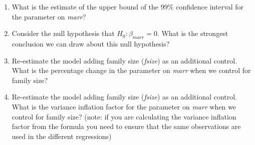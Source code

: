\begin{enumerate}
\item What is the estimate of the upper bound of the 99\% confidence interval for the parameter on \textit{marr}?

\item Consider the null hypothesis that $H_0:\beta_{marr}=0$. What is the strongest conclusion we can draw about this null hypothesis?

\item Re-estimate the model adding family size (\textit{fsize}) as an additional control. What is the percentage change in the parameter on \textit{marr} when we control for family size?

\item Re-estimate the model adding family size (\textit{fsize}) as an additional control. What is the variance inflation factor for the parameter on \textit{marr} when we control for family size? (note: if you are calculating the variance inflation factor from the formula you need to ensure that the same observations are used in the different regressions)
\end{enumerate}

